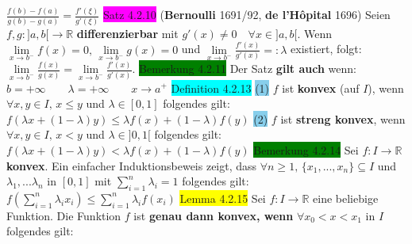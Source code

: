 \documentclass[landscape, 10pt]{article}
\newcommand{\R}{\mathbb{R}}
\begin{document}
\begin{multicols}{3}
         \textcolor{NavyBlue}{$\frac{f(b)-f(a)}{g(b)-g(a)}=\frac{f'(\xi)}{g'(\xi)}$} 
\colorbox{magenta}{Satz 4.2.10} (\textbf{Bernoulli} 1691/92, \textbf{de l'Hôpital} 1696) 
                Seien \textcolor{NavyBlue}{$f,g:]a,b[\longrightarrow\R$} 
                \textbf{differenzierbar} mit 
         \textcolor{NavyBlue}{$g'(x)\neq0\quad\forall x\in]a,b[$}. 
                Wenn \textcolor{NavyBlue}{
                $\lim\limits_{x\to b^{-}}f(x)=0,\,\lim\limits_{x\to b^{-}}g(x)=0$}
                und 
                \textcolor{NavyBlue}{$\lim\limits_{x\to b^{-}}\frac{f'(x)}{g'(x)}=:\lambda$}
                existiert, folgt: 
         \textcolor{NavyBlue}{
                $\lim\limits_{x\to b^{-}}\frac{f(x)}{g(x)}
                =\lim\limits_{x\to b^{-}}\frac{f'(x)}{g'(x)}$}.
\colorbox{green}{Bemerkung 4.2.11} Der Satz \textbf{gilt auch} wenn: 
                \qquad
                \textcolor{NavyBlue}{$b=+\infty\qquad\lambda=+\infty\qquad x\to a^{+}$}
\colorbox{cyan}{Definition 4.2.13} \colorbox{SkyBlue}{(1)} \textcolor{NavyBlue}{$f$}
                ist \textbf{konvex} (auf \textcolor{NavyBlue}{$I$}), wenn 
                \textcolor{NavyBlue}{$\forall x,y\in I,\,x\leqslant y$ und $\lambda\in[0,1]$}
                folgendes gilt: 
         \textcolor{NavyBlue}{
                $f(\lambda x+(1-\lambda)y)\leqslant\lambda f(x)+(1-\lambda)f(y)$}
         \colorbox{SkyBlue}{(2)} \textcolor{NavyBlue}{$f$} ist \textbf{streng konvex}, 
                wenn \textcolor{NavyBlue}{$\forall x,y\in I,\,x<y$}
                und \textcolor{NavyBlue}{$\lambda\in]0,1[$} folgendes gilt: 
         \textcolor{NavyBlue}{
                $f(\lambda x+(1-\lambda)y)<\lambda f(x)+(1-\lambda)f(y)$} 
\colorbox{green}{Bemerkung 4.2.14} Sei \textcolor{NavyBlue}{$f:I\longrightarrow\R$} 
                \textbf{konvex}. Ein einfacher Induktionsbeweis zeigt, dass 
                \textcolor{NavyBlue}{$\forall n\geqslant1,\,\{x_1,...,x_n\}\subseteq I$} 
         und \textcolor{NavyBlue}{$\lambda_1,...\lambda_n$} in 
                \textcolor{NavyBlue}{$[0,1]$} mit 
                \textcolor{NavyBlue}{$\sum_{i=1}^n\lambda_i=1$}
                folgendes gilt: \textcolor{NavyBlue}{
                $f(\sum_{i=1}^n\lambda_i x_i)\leqslant\sum_{i=1}^n\lambda_if(x_i)$}
\colorbox{yellow}{Lemma 4.2.15} Sei \textcolor{NavyBlue}{$f:I\longrightarrow\R$} 
                eine beliebige Funktion. Die Funktion \textcolor{NavyBlue}{$f$}
                ist \textbf{genau dann konvex, wenn} 
         \textcolor{NavyBlue}{$\forall x_0<x<x_1$} in \textcolor{NavyBlue}{$I$}
                folgendes gilt: \textcolor{NavyBlue}{
}
\end{multicols}
\end{document}
